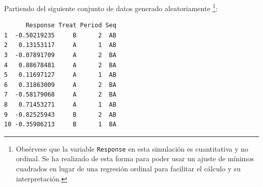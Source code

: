 \documentclass[
  12pt,
  a4paper,
  extrafontsizes,
  onecolumn,
  openright,
  table]{memoir}
\newenvironment{Shaded}{\begin{snugshade}}{\end{snugshade}}
\newcommand{\AttributeTok}[1]{\textcolor[rgb]{0.40,0.45,0.13}{#1}}
\newcommand{\ConstantTok}[1]{\textcolor[rgb]{0.56,0.35,0.01}{#1}}
\newcommand{\DecValTok}[1]{\textcolor[rgb]{0.68,0.00,0.00}{#1}}
\newcommand{\FunctionTok}[1]{\textcolor[rgb]{0.28,0.35,0.67}{#1}}
\newcommand{\NormalTok}[1]{\textcolor[rgb]{0.00,0.23,0.31}{#1}}
\newcommand{\OtherTok}[1]{\textcolor[rgb]{0.00,0.23,0.31}{#1}}
\newcommand{\SpecialCharTok}[1]{\textcolor[rgb]{0.37,0.37,0.37}{#1}}
\newcommand{\StringTok}[1]{\textcolor[rgb]{0.13,0.47,0.30}{#1}}
\begin{document}
Partiendo del siguiente conjunto de datos generado aleatoriamente
\footnote{Obsérvese que la variable \texttt{Response} en esta simulación
  es cuantitativa y no ordinal. Se ha realizado de esta forma para poder
  usar un ajuste de mínimos cuadrados en lugar de una regresión ordinal
  para facilitar el cálculo y su interpretación.}: \scriptsize

\begin{Shaded}
\end{Shaded}

\begin{verbatim}
      Response Treat Period Seq
1  -0.50219235     B      2  AB
2   0.13153117     A      1  AB
3  -0.07891709     A      2  BA
4   0.88678481     A      2  BA
5   0.11697127     A      1  AB
6   0.31863009     A      2  BA
7  -0.58179068     A      2  BA
8   0.71453271     A      1  AB
9  -0.82525943     B      2  AB
10 -0.35986213     B      1  BA
\end{verbatim}
\end{document}
